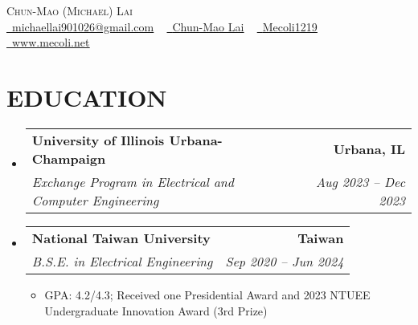 \documentclass[letterpaper,8pt]{article}
\makeatletter
\newcommand{\resumeItem}[1]{
  \item\small{
    {#1 \vspace{-2pt}}
  }
}
\newcommand{\resumeSubheading}[4]{
    \item
    \begin{tabular*}{1.0\textwidth}[t]{l@{\extracolsep{\fill}}r}
      \textbf{#1} & \textbf{\small #2} \\
      \textit{\small#3} & \textit{\small #4} \\
    \end{tabular*}\vspace{-7pt}
}
\newcommand{\resumeSubHeadingListStart}{\begin{itemize}[leftmargin=0.0in, label={}]}
\newcommand{\resumeSubHeadingListEnd}{\end{itemize}}
\newcommand{\resumeItemListStart}{\begin{itemize}}
\newcommand{\resumeItemListEnd}{\end{itemize}\vspace{-5pt}}
\makeatother
\begin{document}

\begin{center}
    {\huge \scshape Chun-Mao (Michael) Lai} \\ \vspace{3pt}
    \href{mailto:michaellai901026@gmail.com}{\raisebox{-0.1\height}\faEnvelope\  \underline{michaellai901026@gmail.com}} ~ 
    \href{https://www.linkedin.com/in/chun-mao-lai-aa1966229}{\raisebox{-0.1\height}\faLinkedin\ \underline{Chun-Mao Lai}}  ~
    \href{https://github.com/Mecoli1219}{\raisebox{-0.1\height}\faGithub\ \underline{Mecoli1219}} ~
    \href{https://www.mecoli.net}{\raisebox{-0.1\height}\faHome\ \underline{www.mecoli.net}}\\
    \vspace{-8pt}
\end{center}

\section{EDUCATION}
  \resumeSubHeadingListStart
    \resumeSubheading
      {University of Illinois Urbana-Champaign}{Urbana, IL}
      {Exchange Program in Electrical and Computer Engineering}{\textnormal{Aug 2023 -- Dec 2023}}
    \resumeSubheading
      {National Taiwan University}{Taiwan}
      {B.S.E. in Electrical Engineering}{\textnormal{Sep 2020 -- Jun 2024}}
      \resumeItemListStart
      \resumeItem{GPA: 4.2/4.3; Received one Presidential Award and 2023 NTUEE Undergraduate Innovation Award (3rd Prize)}
      \resumeItemListEnd
  \resumeSubHeadingListEnd
\vspace{-12pt}
\end{document}
